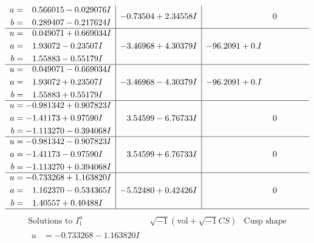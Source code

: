 \documentclass[1p]{elsarticle_modified}
\theoremstyle{definition}
\newcommand{\I}{\sqrt{-1}}
\begin{document}
$$\begin{array}{c|c|c}
\begin{aligned}
a &= \phantom{-}0.566015 - 0.029076 I \\
b &= \phantom{-}0.289407 - 0.217624 I\end{aligned}
 & -0.73504 + 2.34558 I & \phantom{-0.000000 } 0 \\ \hline\begin{aligned}
u &= \phantom{-}0.049071 + 0.669034 I \\
a &= \phantom{-}1.93072 - 0.23507 I \\
b &= \phantom{-}1.55883 - 0.55179 I\end{aligned}
 & -3.46968 + 4.30379 I & -96.2091 + 0. I\phantom{ +0.000000I} \\ \hline\begin{aligned}
u &= \phantom{-}0.049071 - 0.669034 I \\
a &= \phantom{-}1.93072 + 0.23507 I \\
b &= \phantom{-}1.55883 + 0.55179 I\end{aligned}
 & -3.46968 - 4.30379 I & -96.2091 + 0. I\phantom{ +0.000000I} \\ \hline\begin{aligned}
u &= -0.981342 + 0.907823 I \\
a &= -1.41173 + 0.97590 I \\
b &= -1.113270 - 0.394068 I\end{aligned}
 & \phantom{-}3.54599 - 6.76733 I & \phantom{-0.000000 } 0 \\ \hline\begin{aligned}
u &= -0.981342 - 0.907823 I \\
a &= -1.41173 - 0.97590 I \\
b &= -1.113270 + 0.394068 I\end{aligned}
 & \phantom{-}3.54599 + 6.76733 I & \phantom{-0.000000 } 0 \\ \hline\begin{aligned}
u &= -0.733268 + 1.163820 I \\
a &= \phantom{-}1.162370 - 0.534365 I \\
b &= \phantom{-}1.40557 + 0.40488 I\end{aligned}
 & -5.52480 + 0.42426 I & \phantom{-0.000000 } 0\\
 \hline 
 \end{array}$$\newpage$$\begin{array}{c|c|c}  
\text{Solutions to }I^u_{1}& \I (\text{vol} + \sqrt{-1}CS) & \text{Cusp shape}\\
 \hline 
\begin{aligned}
u &= -0.733268 - 1.163820 I \\

\end{aligned}
\end{array}$$
\end{document}
